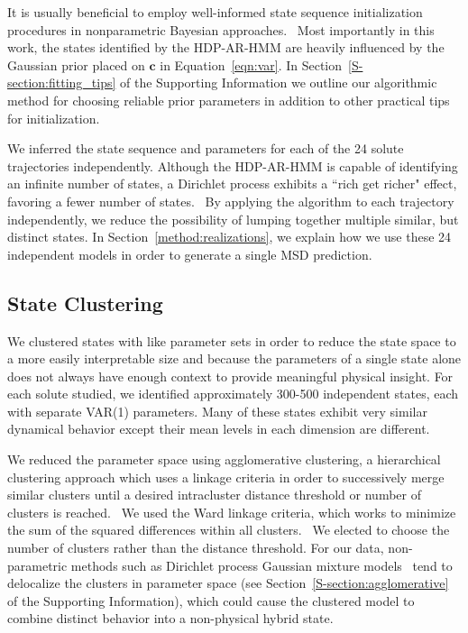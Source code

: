 \documentclass[journal=jpcbfk,manuscript=article]{achemso}
\begin{document}
  It is usually beneficial to employ well-informed state sequence initialization 
  procedures in nonparametric Bayesian approaches.~\cite{fox_bayesian_2010}
  Most importantly in this work, the states identified by the HDP-AR-HMM are heavily 
  influenced by the Gaussian prior placed on $\mathbf{c}$ in Equation~\ref{eqn:var}. In 
  Section~\ref{S-section:fitting_tips} of the Supporting Information we outline our 
  algorithmic method for choosing reliable prior parameters in addition to other 
  practical tips for initialization.

  We inferred the state sequence and parameters for each of the 24 solute 
  trajectories independently. Although the HDP-AR-HMM is capable of identifying 
  an infinite number of states, a Dirichlet process exhibits a ``rich get richer" 
  effect, favoring a fewer number of states.~\cite{dreyer_discovering_2011}
  By applying the algorithm to each trajectory independently, we reduce the 
  possibility of lumping together multiple similar, but distinct states. In 
  Section~\ref{method:realizations}, we explain how we use these 24 independent
  models in order to generate a single MSD prediction.  
  
  \subsection{State Clustering}\label{method:clustering}  

  We clustered states with like parameter sets in order to reduce the state space to
  a more easily interpretable size and because the parameters of a single state 
  alone does not always have enough context to provide meaningful physical insight.
  For each solute studied, we identified approximately 300-500 independent states, 
  each with separate VAR(1) parameters. Many of these states exhibit very similar 
  dynamical behavior except their mean levels in each dimension are different.
  
  We reduced the parameter space using agglomerative clustering, a hierarchical
  clustering approach which uses a linkage criteria in order to successively merge
  similar clusters until a desired intracluster distance threshold or number of
  clusters is reached.~\cite{pedregosa_scikit-learn_2011} We used the Ward linkage 
  criteria, which works to minimize the sum of the squared differences within all
  clusters.~\cite{ward_hierarchical_1963} We elected to choose the number of clusters
  rather than the distance threshold. For our data, non-parametric methods such as 
  Dirichlet process Gaussian mixture models~\cite{pedregosa_scikit-learn_2011,gelman_bayesian_2013}
  tend to delocalize the clusters in parameter space (see Section~\ref{S-section:agglomerative}
  of the Supporting Information), which could cause the clustered model to combine 
  distinct behavior into a non-physical hybrid state.
\end{document}
